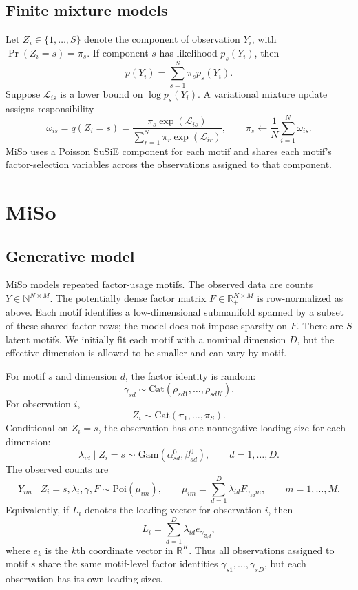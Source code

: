 \documentclass[11pt]{article}
\newcommand{\N}{\mathbb{N}}
\newcommand{\R}{\mathbb{R}}
\newcommand{\Poi}{\mathrm{Poi}}
\newcommand{\Gam}{\mathrm{Gam}}
\newcommand{\Cat}{\mathrm{Cat}}
\theoremstyle{plain}
\theoremstyle{definition}
\begin{document}
\subsection{Finite mixture models}

Let $Z_i\in\{1,\ldots,S\}$ denote the component of observation $Y_i$, with
$\Pr(Z_i=s)=\pi_s$. If component $s$ has likelihood $p_s(Y_i)$, then
\[
  p(Y_i)=\sum_{s=1}^S\pi_sp_s(Y_i).
\]
Suppose $\mathcal L_{is}$ is a lower bound on $\log p_s(Y_i)$. A variational
mixture update assigns responsibility
\[
  \omega_{is}=q(Z_i=s)
  =
  \frac{\pi_s\exp(\mathcal L_{is})}
       {\sum_{r=1}^S\pi_r\exp(\mathcal L_{ir})},
  \qquad
  \pi_s\leftarrow\frac{1}{N}\sum_{i=1}^N\omega_{is}.
\]
MiSo uses a Poisson SuSiE component for each motif and shares each motif's
factor-selection variables across the observations assigned to that component.

\section{MiSo}
\label{sec:miso}

\subsection{Generative model}

MiSo models repeated factor-usage motifs. The observed data are counts
$Y \in \N^{N \times M}$. The potentially dense factor matrix
$F \in \R_+^{K \times M}$ is row-normalized as above. Each motif identifies a
low-dimensional submanifold spanned by a subset of these shared factor rows;
the model does not impose sparsity on $F$. There are $S$ latent motifs. We
initially fit each motif with a
nominal dimension $D$, but the effective dimension is allowed to be smaller and
can vary by motif.

For motif $s$ and dimension $d$, the factor identity is random:
\[
  \gamma_{sd}
  \sim
  \Cat(\rho_{sd1},\ldots,\rho_{sdK}).
\]
For observation $i$,
\[
  Z_i \sim \Cat(\pi_1,\ldots,\pi_S).
\]
Conditional on $Z_i=s$, the observation has one nonnegative loading size for
each dimension:
\[
  \lambda_{id}\mid Z_i=s
  \sim
  \Gam(\alpha_{sd}^0,\beta_{sd}^0),
  \qquad d=1,\ldots,D.
\]
The observed counts are
\[
  Y_{im}\mid Z_i=s,\lambda_i,\gamma,F
  \sim
  \Poi(\mu_{im}),
  \qquad
  \mu_{im} =
  \sum_{d=1}^D \lambda_{id}F_{\gamma_{sd}m},
  \qquad m=1,\ldots,M.
\]
Equivalently, if $L_i$ denotes the loading vector for observation $i$, then
\[
  L_i
  =
  \sum_{d=1}^D \lambda_{id} e_{\gamma_{Z_i d}},
\]
where $e_k$ is the $k$th coordinate vector in $\R^K$. Thus all observations
assigned to motif $s$ share the same motif-level factor identities
$\gamma_{s1},\ldots,\gamma_{sD}$, but each observation has its own loading
sizes.
\end{document}
